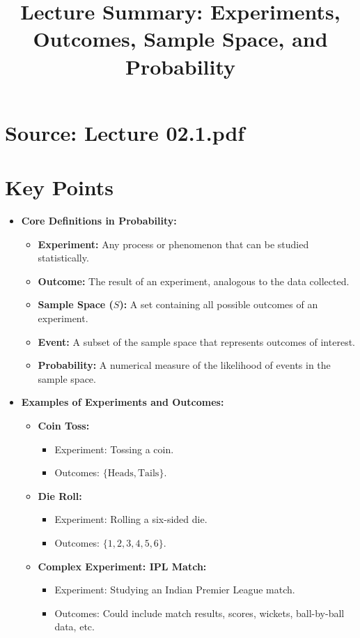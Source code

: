 \documentclass{article}
\title{Lecture Summary: Experiments, Outcomes, Sample Space, and Probability}
\author{}
\date{}
\begin{document}
\maketitle

\section*{Source: Lecture 02.1.pdf}

\section*{Key Points}

\begin{itemize}
  \item \textbf{Core Definitions in Probability:}
    \begin{itemize}
      \item \textbf{Experiment:} Any process or phenomenon that can be studied statistically.
      \item \textbf{Outcome:} The result of an experiment, analogous to the data collected.
      \item \textbf{Sample Space ($S$):} A set containing all possible outcomes of an experiment.
      \item \textbf{Event:} A subset of the sample space that represents outcomes of interest.
      \item \textbf{Probability:} A numerical measure of the likelihood of events in the sample space.
    \end{itemize}

  \item \textbf{Examples of Experiments and Outcomes:}
    \begin{itemize}
      \item \textbf{Coin Toss:}
        \begin{itemize}
          \item Experiment: Tossing a coin.
          \item Outcomes: $\{ \text{Heads}, \text{Tails} \}$.
        \end{itemize}
      \item \textbf{Die Roll:}
        \begin{itemize}
          \item Experiment: Rolling a six-sided die.
          \item Outcomes: $\{ 1, 2, 3, 4, 5, 6 \}$.
        \end{itemize}
      \item \textbf{Complex Experiment: IPL Match:}
        \begin{itemize}
          \item Experiment: Studying an Indian Premier League match.
          \item Outcomes: Could include match results, scores, wickets, ball-by-ball data, etc.
        \end{itemize}
    \end{itemize}


\end{itemize}
\end{document}
